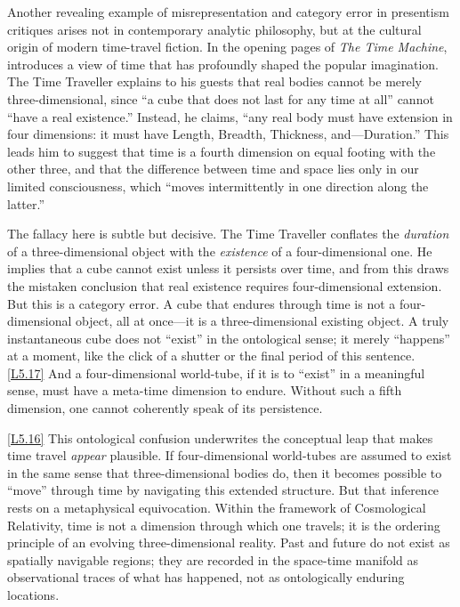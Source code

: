 \documentclass[12pt]{book}
\newcounter{logicanchor}
\newenvironment{logicanchorenv}[1]{\refstepcounter{logicanchor}\label{#1}}{}
\newcommand{\logiclink}[2]{\begin{logicanchorenv}{logic:#1}\end{logicanchorenv}\hyperref[appendix:#1]{[#1]}\xspace}
\begin{document}
\vspace{4pt}

Another revealing example of misrepresentation and category error in presentism critiques arises not in contemporary analytic philosophy, but at the cultural origin of modern time-travel fiction. In the opening pages of \textit{The Time Machine}, \citet{Wells1895} introduces a view of time that has profoundly shaped the popular imagination. The Time Traveller explains to his guests that real bodies cannot be merely three-dimensional, since ``a cube that does not last for any time at all'' cannot ``have a real existence.'' Instead, he claims, ``any real body must have extension in four dimensions: it must have Length, Breadth, Thickness, and---Duration.'' This leads him to suggest that time is a fourth dimension on equal footing with the other three, and that the difference between time and space lies only in our limited consciousness, which ``moves intermittently in one direction along the latter.''

The fallacy here is subtle but decisive. The Time Traveller conflates the \textit{duration} of a three-dimensional object with the \textit{existence} of a four-dimensional one. He implies that a cube cannot exist unless it persists over time, and from this draws the mistaken conclusion that real existence requires four-dimensional extension. But this is a category error. A cube that endures through time is not a four-dimensional object, all at once---it is a three-dimensional existing object. A truly instantaneous cube does not ``exist'' in the ontological sense; it merely ``happens'' at a moment, like the click of a shutter or the final period of this sentence. \logiclink{L5.17}{} And a four-dimensional world-tube, if it is to ``exist'' in a meaningful sense, must have a meta-time dimension to endure. Without such a fifth dimension, one cannot coherently speak of its persistence. 

\logiclink{L5.16}{} This ontological confusion underwrites the conceptual leap that makes time travel \textit{appear} plausible. If four-dimensional world-tubes are assumed to exist in the same sense that three-dimensional bodies do, then it becomes possible to ``move'' through time by navigating this extended structure. But that inference rests on a metaphysical equivocation. Within the framework of Cosmological Relativity, time is not a dimension through which one travels; it is the ordering principle of an evolving three-dimensional reality. Past and future do not exist as spatially navigable regions; they are recorded in the space-time manifold as observational traces of what has happened, not as ontologically enduring locations.
\end{document}
